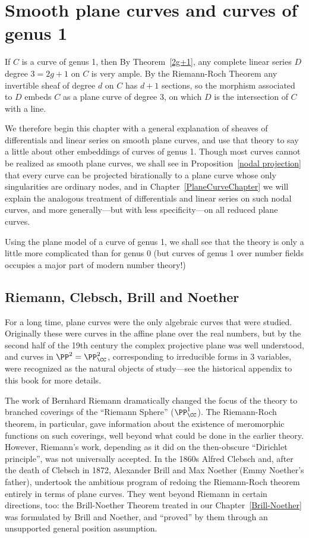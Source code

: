 

\chapter{Smooth plane curves and curves of genus 1}\label{3b}\label{genus 1 chapter}

If $C$ is a curve of genus 1, then By Theorem~\ref{2g+1}, any complete linear series $D$
degree $3 = 2g+1$ on $C$ is very ample. By the Riemann-Roch Theorem any invertible sheaf
of degree $d$ on $C$ has $d+1$ sections, so the morphism associated to $D$ embeds $C$
as a plane curve of degree 3, on which $D$ is the intersection of $C$ with a line. 

We therefore begin this chapter with a general explanation of sheaves of differentials and linear
series on smooth plane curves, and use that theory to say a little about other embeddings of 
curves of genus 1. Though most curves cannot be realized as smooth plane curves, we shall see
in Proposition~\ref{nodal projection} that every curve can be projected birationally to a plane curve whose only singularities are ordinary nodes, and in Chapter~\ref{PlaneCurveChapter} we will
explain the analogous treatment of differentials and linear series on such nodal curves, and more
generally---but with less specificity---on all reduced plane curves.

Using the plane model of a curve of genus 1, we shall see  that the theory  is only a little more complicated than for genus 0 (but curves of genus 1 over number fields occupies a major part of modern number theory!)  


\section{Riemann, Clebsch, Brill and Noether}
For a long time, plane curves were the only algebraic curves that were studied. Originally these were curves in the affine plane over the real numbers, but by the second half of the 19th century the complex projective plane was well understood, and curves in $\PP^2 = \PP^2_\CC$, corresponding to irreducible forms in 3 variables, were recognized as the natural objects of study---see the historical appendix to this book for more details.

The work of Bernhard Riemann dramatically changed the focus of the theory to branched coverings of   the ``Riemann Sphere'' ($\PP^1_\CC$). The Riemann-Roch theorem, in particular, gave information about the existence of meromorphic functions on such coverings, well beyond what could be done in the earlier theory. However, Riemann's work, depending as it did on the then-obscure ``Dirichlet principle'', was not universally accepted. In the 1860s Alfred Clebsch and, after the death of Clebsch  in 1872, Alexander Brill and Max Noether (Emmy Noether's father), undertook the ambitious program of redoing the Riemann-Roch theorem entirely in terms of plane curves. They went beyond Riemann in certain directions, too: the Brill-Noether Theorem treated in our Chapter~\ref{Brill-Noether} was formulated by Brill and Noether, and ``proved'' by them through an unsupported general position assumption. 

